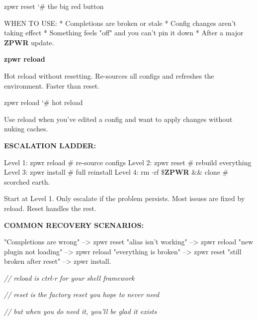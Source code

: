\documentclass[11pt,a4paper,twoside]{book}
\begin{document}
\begin{codebox}
\color{neongreen}zpwr reset                  {\char`\#} the big red button\\
\end{codebox}

WHEN TO USE: * Completions are broken or stale * Config changes aren't taking effect * Something feels "off" and you can't pin it down * After a major \textbf{ZPWR} update.


\vspace{12pt}
{\bfseries\color{neonyellow} zpwr reload}\vspace{4pt}

Hot reload without resetting. Re-sources all configs and refreshes the environment. Faster than reset.

\begin{codebox}
\color{neongreen}zpwr reload                 {\char`\#} hot reload\\
\end{codebox}

Use reload when you've edited a config and want to apply changes without nuking caches.


\vspace{12pt}
{\bfseries\color{neonyellow} ESCALATION LADDER:}\vspace{4pt}

Level 1: zpwr reload           \# re-source configs Level 2: zpwr reset            \# rebuild everything Level 3: zpwr install          \# full reinstall Level 4: rm -rf \$\textbf{ZPWR} \&\& clone \# scorched earth.

Start at Level 1. Only escalate if the problem persists. Most issues are fixed by reload. Reset handles the rest.


\vspace{12pt}
{\bfseries\color{neonyellow} COMMON RECOVERY SCENARIOS:}\vspace{4pt}

"Completions are wrong"    --> zpwr reset "alias isn't working"      --> zpwr reload "new plugin not loading"   --> zpwr reload "everything is broken"     --> zpwr reset "still broken after reset" --> zpwr install.

{\small\itshape\color{dimtext} // reload is ctrl-r for your shell framework}

{\small\itshape\color{dimtext} // reset is the factory reset you hope to never need}

{\small\itshape\color{dimtext} // but when you do need it, you'll be glad it exists}
\end{document}
